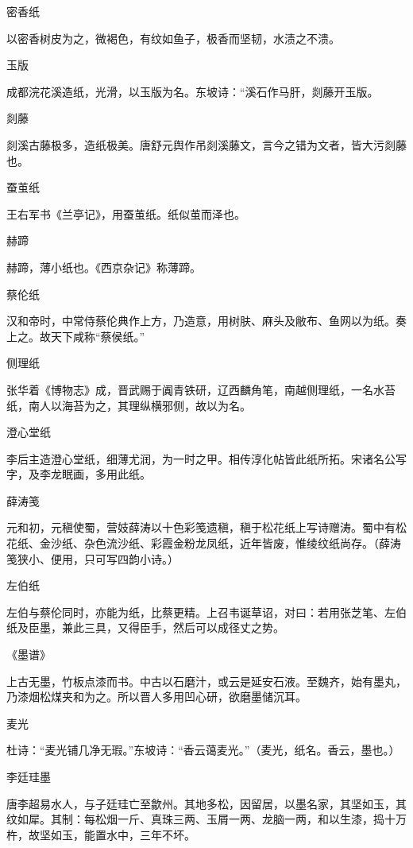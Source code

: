 \documentclass[a4paper,12pt,UTF8,twoside]{ctexbook}
\begin{document}
    密香纸
    
    以密香树皮为之，微褐色，有纹如鱼子，极香而坚韧，水渍之不溃。
    
    玉版
    
    成都浣花溪造纸，光滑，以玉版为名。东坡诗：“溪石作马肝，剡藤开玉版。
    
    剡藤
    
    剡溪古藤极多，造纸极美。唐舒元舆作吊剡溪藤文，言今之错为文者，皆大污剡藤也。
    
    蚕茧纸
    
    王右军书《兰亭记》，用蚕茧纸。纸似茧而泽也。
    
    赫蹄
    
    赫蹄，薄小纸也。《西京杂记》称薄蹄。
    
    蔡伦纸
    
    汉和帝时，中常侍蔡伦典作上方，乃造意，用树肤、麻头及敝布、鱼网以为纸。奏上之。故天下咸称“蔡侯纸。”
    
    侧理纸
    
    张华着《博物志》成，晋武赐于阗青铁研，辽西麟角笔，南越侧理纸，一名水苔纸，南人以海苔为之，其理纵横邪侧，故以为名。
    
    澄心堂纸
    
    李后主造澄心堂纸，细薄尤润，为一时之甲。相传淳化帖皆此纸所拓。宋诸名公写字，及李龙眠画，多用此纸。
    
    薛涛笺
    
    元和初，元稹使蜀，营妓薛涛以十色彩笺遗稹，稹于松花纸上写诗赠涛。蜀中有松花纸、金沙纸、杂色流沙纸、彩霞金粉龙凤纸，近年皆废，惟绫纹纸尚存。（薛涛笺狭小、便用，只可写四韵小诗。）
    
    左伯纸
    
    左伯与蔡伦同时，亦能为纸，比蔡更精。上召韦诞草诏，对曰：若用张芝笔、左伯纸及臣墨，兼此三具，又得臣手，然后可以成径丈之势。
    
    《墨谱》
    
    上古无墨，竹板点漆而书。中古以石磨汁，或云是延安石液。至魏齐，始有墨丸，乃漆烟松煤夹和为之。所以晋人多用凹心研，欲磨墨储沉耳。
    
    麦光
    
    杜诗：“麦光铺几净无瑕。”东坡诗：“香云蔼麦光。”（麦光，纸名。香云，墨也。）
    
    李廷珪墨
    
    唐李超易水人，与子廷珪亡至歙州。其地多松，因留居，以墨名家，其坚如玉，其纹如犀。其制：每松烟一斤、真珠三两、玉屑一两、龙脑一两，和以生漆，捣十万杵，故坚如玉，能置水中，三年不坏。
    
\end{document}
